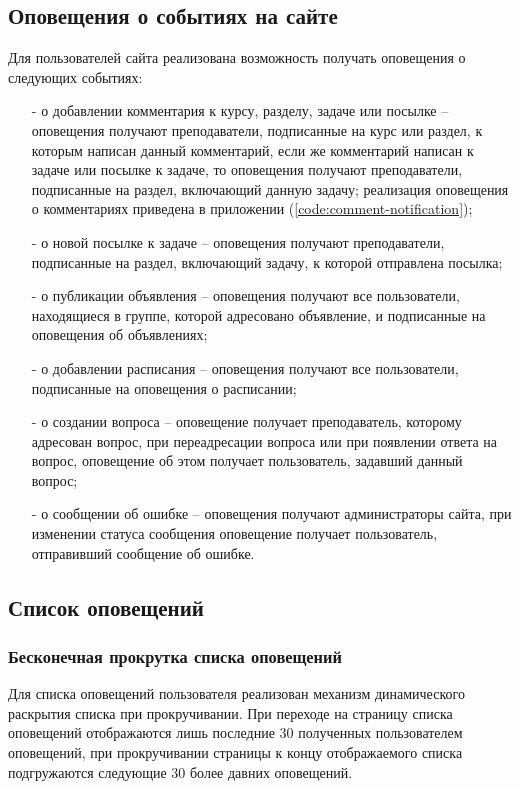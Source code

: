 \documentclass[14pt, a4paper, oneside]{extarticle}
\begin{document}
\subsection{Оповещения о событиях на сайте}
Для пользователей сайта реализована возможность получать оповещения о следующих событиях:
\begin{itemize}
    \item [-] о добавлении комментария к курсу, разделу, задаче или посылке – оповещения получают преподаватели, подписанные на курс или раздел, к которым написан данный комментарий, если же комментарий написан к задаче или посылке к задаче, то оповещения получают преподаватели, подписанные на раздел, включающий данную задачу; реализация оповещения о комментариях приведена в приложении (\ref{code:comment-notification});
    \item [-] о новой посылке к задаче – оповещения получают преподаватели, подписанные на раздел, включающий задачу, к которой отправлена посылка;
    \item [-] о публикации объявления – оповещения получают все пользователи, находящиеся в группе, которой адресовано объявление, и подписанные на оповещения об объявлениях;
    \item [-] о добавлении расписания – оповещения получают все пользователи, подписанные на оповещения о расписании;
    \item [-] о создании вопроса – оповещение получает преподаватель, которому адресован вопрос, при переадресации вопроса или при появлении ответа на вопрос, оповещение об этом получает пользователь, задавший данный вопрос;
    \item [-] о сообщении об ошибке – оповещения получают администраторы сайта, при изменении статуса сообщения оповещение получает пользователь, отправивший сообщение об ошибке.
\end{itemize}
\subsection{Список оповещений}
\subsubsection{Бесконечная прокрутка списка оповещений}
Для списка оповещений пользователя реализован механизм динамического раскрытия списка при прокручивании. При переходе на страницу списка оповещений отображаются лишь последние 30 полученных пользователем оповещений, при прокручивании страницы к концу отображаемого списка подгружаются следующие 30 более давних оповещений.
\end{document}
